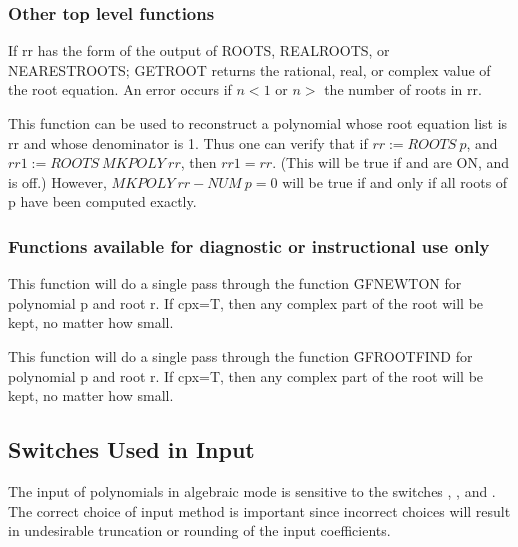 \subsubsection{Other top level functions}

\begin{description}
   
\item[GETROOT(n,rr);] If rr has the form of the output of ROOTS, REALROOTS,
or NEARESTROOTS; GETROOT returns the rational, real, or complex value of
the root equation.  An error occurs if $n<1$ or $n>$ the number of roots in
rr.

\item[MKPOLY rr;] This function can be used to reconstruct a polynomial
whose root equation list is rr and whose denominator is 1.  Thus one can
verify that if $rr := ROOTS~p$, and $rr1 := ROOTS~MKPOLY~rr$, then
$rr1 = rr$. (This will be true if  and  are ON,
and  is off.)
However, $MKPOLY~rr - NUM~p = 0$ will be true if and only if all roots of p
have been computed exactly.
\end{description}

\subsubsection{Functions available for diagnostic or instructional use only}

\begin{description}
\item[GFNEWT(p,r,cpx);] This function will do a single pass through the
function \f{GFNEWTON} for polynomial p and root r.  If cpx=T, then any
complex part of the root will be kept, no matter how small.

\item[GFROOT(p,r,cpx);] This function will do a single pass through the
function \f{GFROOTFIND} for polynomial p and root r.  If cpx=T, then any
complex part of the root will be kept, no matter how small.
\end{description}

\subsection{Switches Used in Input}

The input of polynomials in algebraic mode is sensitive to the switches
, , and .  The correct choice of
input method is important since incorrect choices will result in
undesirable truncation or rounding of the input coefficients.

